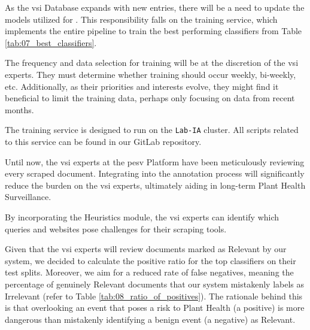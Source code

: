 \label{08_training_service}

As the \gls{vsi} Database expands with new entries, there will be a need to update the models utilized for \textclassification{}. This responsibility falls on the training service, which implements the entire pipeline to train the best performing classifiers from Table \ref{tab:07_best_classifiers}.

The frequency and data selection for training will be at the discretion of the \gls{vsi} experts. They must determine whether training should occur weekly, bi-weekly, etc. Additionally, as their priorities and interests evolve, they might find it beneficial to limit the training data, perhaps only focusing on data from recent months.

The training service is designed to run on the \texttt{Lab-IA} cluster. All scripts related to this service can be found in our GitLab repository.



\label{08_consequences}


Until now, the \gls{vsi} experts at the \gls{pesv} Platform have been meticulously reviewing every scraped document. 
Integrating \textclassification{} into the annotation process will significantly reduce the burden on the \gls{vsi} experts, ultimately aiding in long-term Plant Health Surveillance.

By incorporating the Heuristics module, the \gls{vsi} experts can identify which queries and websites pose challenges for their scraping tools.

Given that the \gls{vsi} experts will review documents marked as Relevant by our system, we decided to calculate the positive ratio for the top classifiers on their test splits. Moreover, we aim for a reduced rate of false negatives, meaning the percentage of genuinely Relevant documents that our system mistakenly labels as Irrelevant (refer to Table \ref{tab:08_ratio_of_positives}). The rationale behind this is that overlooking an event that poses a risk to Plant Health (a positive) is more dangerous than mistakenly identifying a benign event (a negative) as Relevant.

